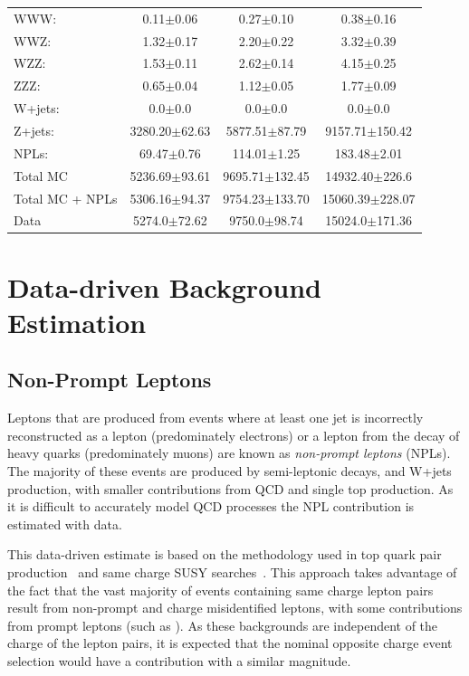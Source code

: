 \begin{table}[htbp]
\begin{tabular}{lccc}
WWW\@: & 0.11$\pm$0.06 & 0.27$\pm$0.10 & 0.38$\pm$0.16    \\
WWZ\@: & 1.32$\pm$0.17 & 2.20$\pm$0.22 & 3.32$\pm$0.39    \\
WZZ\@: & 1.53$\pm$0.11 & 2.62$\pm$0.14 & 4.15$\pm$0.25   \\
ZZZ\@: & 0.65$\pm$0.04 & 1.12$\pm$0.05 & 1.77$\pm$0.09    \\
W+jets: & 0.0$\pm$0.0 & 0.0$\pm$0.0 & 0.0$\pm$0.0    \\
Z+jets: & 3280.20$\pm$62.63 & 5877.51$\pm$87.79 & 9157.71$\pm$150.42    \\
\hline
NPLs: & 69.47$\pm$0.76 & 114.01$\pm$1.25 & 183.48$\pm$2.01   \\
\hline
Total MC & 5236.69$\pm$93.61 & 9695.71$\pm$132.45 & 14932.40$\pm$226.6    \\
Total MC + NPLs & 5306.16$\pm$94.37 & 9754.23$\pm$133.70 & 15060.39$\pm$228.07    \\
\hline
Data & 5274.0$\pm$72.62 & 9750.0$\pm$98.74 & 15024.0$\pm$171.36    \\
\hline
\end{tabular}
\end{table}


\section{Data-driven Background Estimation}\label{sec:dataDrivenBackground}

\subsection{Non-Prompt Leptons}\label{sec:NPLs}
Leptons that are produced from events where at least one jet is incorrectly reconstructed as a lepton (predominately electrons) or a lepton from the decay of heavy quarks (predominately muons) are known as \emph{non-prompt leptons} (NPLs).
The majority of these events are produced by semi-leptonic \ttbar decays, and W+jets production, with smaller contributions from QCD and single top production.
As it is difficult to accurately model QCD processes the NPL contribution is estimated with data.

This data-driven estimate is based on the methodology used in top quark pair production~\cite{CMS:2016syx} and same charge SUSY searches~\cite{CMS:2015vqc}.
This approach takes advantage of the fact that the vast majority of events containing same charge lepton pairs result from non-prompt and charge misidentified leptons, with some contributions from prompt leptons (such as \ttV).
As these backgrounds are independent of the charge of the lepton pairs, it is expected that the nominal opposite charge event selection would have a contribution with a similar magnitude.

